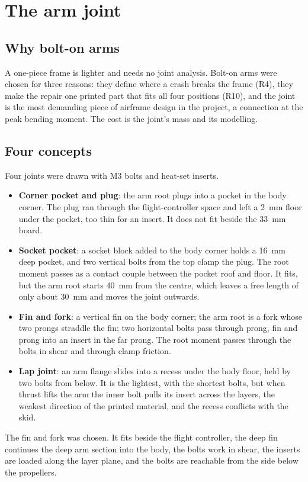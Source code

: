 \section{The arm joint}\label{sec:arch-joint}

\subsection{Why bolt-on arms}

A one-piece frame is lighter and needs no joint analysis. Bolt-on arms were chosen for three reasons: they define where a crash breaks the frame (R4), they make the repair one printed part that fits all four positions (R10), and the joint is the most demanding piece of airframe design in the project, a connection at the peak bending moment. The cost is the joint's mass and its modelling.

\subsection{Four concepts}

Four joints were drawn with M3 bolts and heat-set inserts.
\begin{itemize}
\item \textbf{Corner pocket and plug}: the arm root plugs into a pocket in the body corner. The plug ran through the flight-controller space and left a \SI{2}{mm} floor under the pocket, too thin for an insert. It does not fit beside the \SI{33}{mm} board.
\item \textbf{Socket pocket}: a socket block added to the body corner holds a \SI{16}{mm} deep pocket, and two vertical bolts from the top clamp the plug. The root moment passes as a contact couple between the pocket roof and floor. It fits, but the arm root starts \SI{40}{mm} from the centre, which leaves a free length of only about \SI{30}{mm} and moves the joint outwards.
\item \textbf{Fin and fork}: a vertical fin on the body corner; the arm root is a fork whose two prongs straddle the fin; two horizontal bolts pass through prong, fin and prong into an insert in the far prong. The root moment passes through the bolts in shear and through clamp friction.
\item \textbf{Lap joint}: an arm flange slides into a recess under the body floor, held by two bolts from below. It is the lightest, with the shortest bolts, but when thrust lifts the arm the inner bolt pulls its insert across the layers, the weakest direction of the printed material, and the recess conflicts with the skid.
\end{itemize}
The fin and fork was chosen. It fits beside the flight controller, the deep fin continues the deep arm section into the body, the bolts work in shear, the inserts are loaded along the layer plane, and the bolts are reachable from the side below the propellers.


